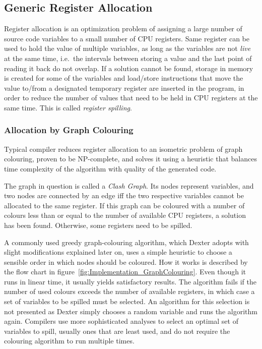 \documentclass[12pt,twoside,notitlepage]{report}
\begin{document}
\subsection{Generic Register Allocation}

Register allocation is an optimization problem of assigning a large number of source code variables to a small number of CPU registers. Same register can be used to hold the value of multiple variables, as long as the variables are not \emph{live} at the same time, i.e.\ the intervals between storing a value and the last point of reading it back do not overlap. If a solution cannot be found, storage in memory is created for some of the variables and load/store instructions that move the value to/from a designated temporary register are inserted in the program, in order to reduce the number of values that need to be held in CPU registers at the same time. This is called \emph{register spilling}.

\subsubsection{Allocation by Graph Colouring}

Typical compiler reduces register allocation to an isometric problem of graph colouring, proven to be NP-complete, and solves it using a heuristic that balances time complexity of the algorithm with quality of the generated code. 

The graph in question is called a \emph{Clash Graph}. Its nodes represent variables, and two nodes are connected by an edge iff the two respective variables cannot be allocated to the same register. If this graph can be coloured with a number of colours less than or equal to the number of available CPU registers, a solution has been found. Otherwise, some registers need to be spilled.

A commonly used greedy graph-colouring algorithm, which Dexter adopts with slight modifications explained later on, uses a simple heuristic to choose a sensible order in which nodes should be coloured. How it works is described by the flow chart in figure~\ref{fig:Implementation_GraphColouring}. Even though it runs in linear time, it usually yields satisfactory results. The algorithm fails if the number of used colours exceeds the number of available registers, in which case a set of variables to be spilled must be selected. An algorithm for this selection is not presented as Dexter simply chooses a random variable and runs the algorithm again. Compilers use more sophisticated analyses to select an optimal set of variables to spill, usually ones that are least used, and do not require the colouring algorithm to run multiple times.
\end{document}
